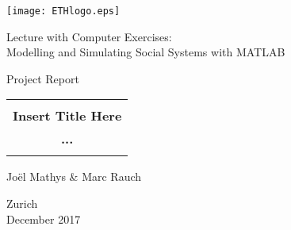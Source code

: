 
\thispagestyle{empty}

\begin{center}
\texttt{[image: ETHlogo.eps]}

\bigskip


\bigskip


\bigskip


\LARGE{ 	Lecture with Computer Exercises:\\ }
\LARGE{ Modelling and Simulating Social Systems with MATLAB\\}

\bigskip

\bigskip

\small{Project Report}\\

\bigskip

\bigskip

\bigskip

\bigskip


\begin{tabular}{|c|}
\hline
\\
\textbf{\LARGE{Insert Title Here}}\\
\textbf{\LARGE{...}}\\
\\
\hline
\end{tabular}
\bigskip

\bigskip

\bigskip

\LARGE{Jo\"el Mathys \& Marc Rauch}



\bigskip

\bigskip

\bigskip

\bigskip

\bigskip

\bigskip

\bigskip

\bigskip

Zurich\\
December 2017\\

\end{center}


